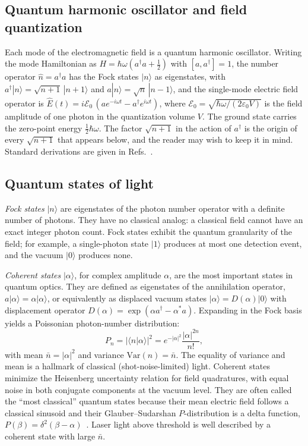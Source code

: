 \documentclass{iopjournal}
\begin{document}
\subsection{Quantum harmonic oscillator and field quantization}
\label{sec:quantization}

Each mode of the electromagnetic field is a quantum harmonic oscillator. Writing the mode Hamiltonian as $H = \hbar\omega(a^\dagger a + \tfrac{1}{2})$ with $[a, a^\dagger] = 1$, the number operator $\hat{n} = a^\dagger a$ has the Fock states $|n\rangle$ as eigenstates, with $a^\dagger|n\rangle = \sqrt{n+1}\,|n+1\rangle$ and $a|n\rangle = \sqrt{n}\,|n-1\rangle$, and the single-mode electric field operator is $\hat{E}(t) = i\mathcal{E}_0\,(a e^{-i\omega t} - a^\dagger e^{i\omega t})$, where $\mathcal{E}_0 = \sqrt{\hbar\omega/(2\varepsilon_0 V)}$ is the field amplitude of one photon in the quantization volume $V$. The ground state carries the zero-point energy $\tfrac{1}{2}\hbar\omega$. The factor $\sqrt{n+1}$ in the action of $a^\dagger$ is the origin of every $\sqrt{n+1}$ that appears below, and the reader may wish to keep it in mind. Standard derivations are given in Refs.~\cite{scully1997, gerry2004}.


\subsection{Quantum states of light}
\label{sec:states}

\textit{Fock states} $|n\rangle$ are eigenstates of the photon number operator with a definite number of photons. They have no classical analog: a classical field cannot have an exact integer photon count. Fock states exhibit the quantum granularity of the field; for example, a single-photon state $|1\rangle$ produces at most one detection event, and the vacuum $|0\rangle$ produces none.

\textit{Coherent states} $|\alpha\rangle$, for complex amplitude $\alpha$, are the most important states in quantum optics. They are defined as eigenstates of the annihilation operator, $a|\alpha\rangle = \alpha|\alpha\rangle$, or equivalently as displaced vacuum states $|\alpha\rangle = D(\alpha)|0\rangle$ with displacement operator $D(\alpha) = \exp(\alpha a^\dagger - \alpha^* a)$. Expanding in the Fock basis yields a Poissonian photon-number distribution:
\begin{equation}
P_n = |\langle n|\alpha\rangle|^2 = e^{-|\alpha|^2} \frac{|\alpha|^{2n}}{n!},
\label{eq:poisson}
\end{equation}
with mean $\bar{n} = |\alpha|^2$ and variance $\text{Var}(n) = \bar{n}$. The equality of variance and mean is a hallmark of classical (shot-noise-limited) light. Coherent states minimize the Heisenberg uncertainty relation for field quadratures, with equal noise in both conjugate components at the vacuum level. They are often called the ``most classical'' quantum states because their mean electric field follows a classical sinusoid and their Glauber--Sudarshan $P$-distribution is a delta function, $P(\beta) = \delta^2(\beta - \alpha)$~\cite{glauber1963}. Laser light above threshold is well described by a coherent state with large $\bar{n}$.
\end{document}
